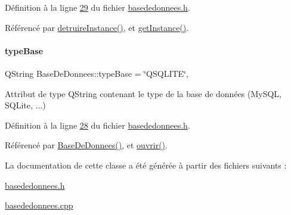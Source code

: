 Définition à la ligne \hyperlink{basededonnees_8h_source_l00029}{29} du fichier \hyperlink{basededonnees_8h_source}{basededonnees.\+h}.



Référencé par \hyperlink{basededonnees_8cpp_source_l00044}{detruire\+Instance()}, et \hyperlink{basededonnees_8cpp_source_l00031}{get\+Instance()}.

\mbox{\label{class_base_de_donnees_ab682b82167f494496a6531bfe522b42b}} 
\paragraph{\texorpdfstring{type\+Base}{typeBase}}
{\footnotesize\ttfamily Q\+String Base\+De\+Donnees\+::type\+Base = \char`\"{}Q\+S\+Q\+L\+I\+TE\char`\"{}\hspace{0.3cm}{\ttfamily [static]}, {\ttfamily [private]}}



Attribut de type Q\+String contenant le type de la base de données (My\+S\+QL, S\+Q\+Lite, ...) 



Définition à la ligne \hyperlink{basededonnees_8h_source_l00028}{28} du fichier \hyperlink{basededonnees_8h_source}{basededonnees.\+h}.



Référencé par \hyperlink{basededonnees_8cpp_source_l00015}{Base\+De\+Donnees()}, et \hyperlink{basededonnees_8cpp_source_l00063}{ouvrir()}.



La documentation de cette classe a été générée à partir des fichiers suivants \+:\begin{DoxyCompactItemize}
\item 
\hyperlink{basededonnees_8h}{basededonnees.\+h}\item 
\hyperlink{basededonnees_8cpp}{basededonnees.\+cpp}\end{DoxyCompactItemize}
